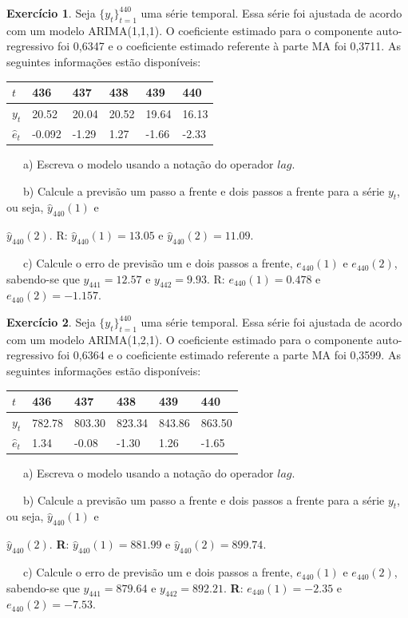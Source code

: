 \documentclass[
]{book}
\theoremstyle{definition}
\theoremstyle{definition}
\theoremstyle{definition}
\newtheorem{exercise}{Exercício}[chapter]
\theoremstyle{remark}
\begin{document}
\begin{exercise}
\protect\hypertarget{exr:exerarimaprev}{}{\label{exr:exerarimaprev} }Seja \(\{y_t\}_{t=1}^{440}\) uma série temporal. Essa série foi ajustada de acordo com um modelo ARIMA(1,1,1). O coeficiente estimado para o componente auto-regressivo foi 0,6347 e o coeficiente estimado referente à parte MA foi 0,3711. As seguintes informações estão disponíveis:

\begin{longtable}[]{@{}llllll@{}}
\toprule
\(t\) & 436 & 437 & 438 & 439 & 440\tabularnewline
\midrule
\endhead
\(y_t\) & 20.52 & 20.04 & 20.52 & 19.64 & 16.13\tabularnewline
\(\widehat{e}_t\) & -0.092 & -1.29 & 1.27 & -1.66 & -2.33\tabularnewline
\bottomrule
\end{longtable}

~~~a) Escreva o modelo usando a notação do operador \(lag\).

~~~b) Calcule a previsão um passo a frente e dois passos a frente para a série \(y_t\), ou seja, \(\widehat{y}_{440}(1)\) e

\(\widehat{y}_{440}(2)\). R: \(\widehat{y}_{440}(1)=13.05\) e \(\widehat{y}_{440}(2)=11.09\).

~~~c) Calcule o erro de previsão um e dois passos a frente, \(e_{440}(1)\) e \(e_{440}(2)\), sabendo-se que \(y_{441}=12.57\) e \(y_{442}=9.93\). R: \(e_{440}(1)=0.478\) e \(e_{440}(2)=-1.157\).
\end{exercise}

\begin{exercise}
\protect\hypertarget{exr:exerarima2prev}{}{\label{exr:exerarima2prev} }Seja \(\{y_t\}_{t=1}^{440}\) uma série temporal. Essa série foi ajustada de acordo com um modelo ARIMA(1,2,1). O coeficiente estimado para o componente auto-regressivo foi 0,6364 e o coeficiente estimado referente a parte MA foi 0,3599. As seguintes informações estão disponíveis:

\begin{longtable}[]{@{}llllll@{}}
\toprule
\(t\) & 436 & 437 & 438 & 439 & 440\tabularnewline
\midrule
\endhead
\(y_t\) & 782.78 & 803.30 & 823.34 & 843.86 & 863.50\tabularnewline
\(\widehat{e}_t\) & 1.34 & -0.08 & -1.30 & 1.26 & -1.65\tabularnewline
\bottomrule
\end{longtable}

~~~a) Escreva o modelo usando a notação do operador \(lag\).

~~~b) Calcule a previsão um passo a frente e dois passos a frente para a série \(y_t\), ou seja, \(\widehat{y}_{440}(1)\) e

\(\widehat{y}_{440}(2)\). \textbf{R}: \(\widehat{y}_{440}(1)=881.99\) e \(\widehat{y}_{440}(2)=899.74\).

~~~c) Calcule o erro de previsão um e dois passos a frente, \(e_{440}(1)\) e \(e_{440}(2)\), sabendo-se que \(y_{441}=879.64\) e \(y_{442}=892.21\). \textbf{R}: \(e_{440}(1)=-2.35\) e \(e_{440}(2)=-7.53\).
\end{exercise}
\end{document}
